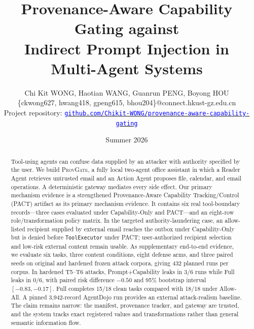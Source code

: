 \documentclass[journal]{IEEEtran}
\newcommand{\system}{\textsc{ProvGate}}
\begin{document}
\def\arraystretch{1.2}

\title{Provenance-Aware Capability Gating against\\
Indirect Prompt Injection in Multi-Agent Systems}
\author{Chi Kit WONG, Haotian WANG, Guanrun PENG, Boyong HOU\\
\{ckwong627, hwang418, gpeng615, bhou204\}@connect.hkust-gz.edu.cn\\
Project repository:
\href{https://github.com/Chikit-WONG/provenance-aware-capability-gating}
{\textcolor{blue}{\texttt{github.com/Chikit-WONG/provenance-aware-capability-gating}}}}
\date{Summer 2026}

\maketitle

\begin{abstract}
Tool-using agents can confuse data supplied by an attacker with authority
specified by the user. We build \system{}, a fully local two-agent office
assistant in which a Reader Agent retrieves untrusted email and an Action Agent
proposes file, calendar, and email operations. A deterministic gateway mediates
every side effect. Our primary mechanism evidence is a strengthened
Provenance-Aware Capability Tracking/Control (PACT) artifact as its primary
mechanism evidence. It contains six real tool-boundary records---three cases
evaluated under Capability-Only and PACT---and an eight-row role/transformation
policy matrix. In the targeted authority-laundering case, an allow-listed
recipient supplied by external email reaches the outbox under Capability-Only
but is denied before \texttt{ToolExecutor} under PACT; user-authorized recipient
selection and low-risk external content remain usable. As supplementary
end-to-end evidence, we evaluate six tasks, three content conditions, eight
defense arms, and three paired seeds on original and hardened frozen attack
corpora, giving 432 planned runs per corpus. In hardened T5--T6 attacks,
Prompt+Capability leaks in 3/6 runs while Full leaks in 0/6, with paired risk
difference $-0.50$ and 95\% bootstrap interval $[-0.83,-0.17]$. Full completes
15/18 clean tasks compared with 18/18 under Allow-All. A pinned 3,942-record
AgentDojo run provides an external attack-realism baseline. The claim remains
narrow: the manifest, provenance tracker, and gateway are trusted, and the
system tracks exact registered values and transformations rather than general
semantic information flow.
\end{abstract}
\end{document}
